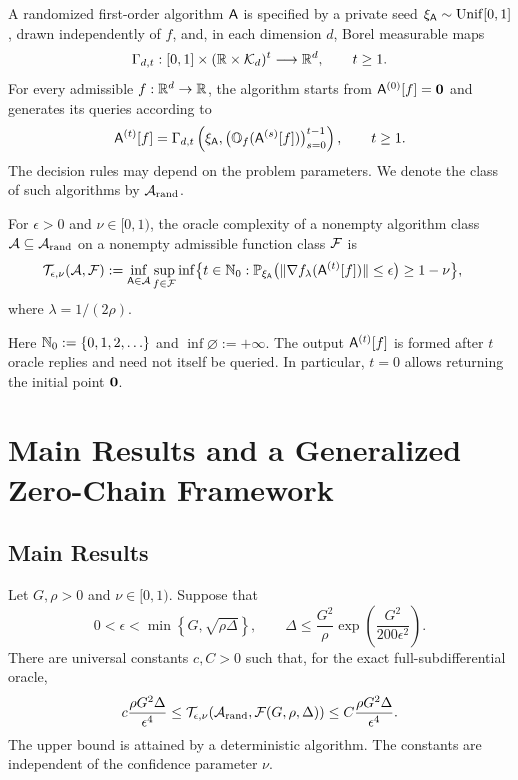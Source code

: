 \begin{definition}
\label{def:randomized-algorithm}
A randomized first-order algorithm ${\mathsf{A}}$ is specified by a private
seed $\xi_{{\mathsf{A}}}\sim\operatorname{Unif}[0,1]$, drawn independently
of $f$, and, in each dimension $d$, Borel measurable maps
\[
 \Gamma_{d,t}:
 [0,1]\times({\mathbb{R}}\times\mathcal K_d)^t\longrightarrow{\mathbb{R}}^d,
 \qquad t\geq1.
\]
For every admissible $f:{\mathbb{R}}^d\to{\mathbb{R}}$, the algorithm starts from
${\mathsf{A}}^{(0)}[f]={\mathbf 0}$ and generates its queries according to
\[
 {\mathsf{A}}^{(t)}[f]=\Gamma_{d,t}\left(
 \xi_{{\mathsf{A}}},
 \bigl(\mathbb O_f({\mathsf{A}}^{(s)}[f])\bigr)_{s=0}^{t-1}
 \right),\qquad t\geq1.
\]
The decision rules may depend on the problem parameters.
We denote the class of such algorithms by $\mathcal A_{\operatorname{rand}}$.
\end{definition}

\begin{definition}
\label{def:complexity-algorithm-class}
For $\epsilon>0$ and $\nu\in[0,1)$, the oracle complexity
of a nonempty algorithm class ${\cal A}\subseteq{\cal A}_{\operatorname{rand}}$
on a nonempty admissible function class ${\cal F}$ is
\[
\begin{aligned}
 {\cal T}_{\epsilon,\nu}({\cal A},{\cal F})
 :=\inf_{{\mathsf{A}}\in{\cal A}}\sup_{f\in{\cal F}}
 \inf\bigl\{t\in{\mathbb{N}}_0:\;&
 {\mathbb{P}}_{\xi_{{\mathsf{A}}}}\bigl(
 \|\nabla f_\lambda({\mathsf{A}}^{(t)}[f])\|\leq\epsilon
 \bigr)\geq1-\nu\bigr\},
\end{aligned}
\]
where $\lambda=1/(2\rho)$.
\end{definition}

Here ${\mathbb{N}}_0:=\{0,1,2,\ldots\}$ and $\inf\varnothing:=+\infty$.
The output ${\mathsf{A}}^{(t)}[f]$ is formed after $t$ oracle replies
and need not itself be queried. In particular, $t=0$
allows returning the initial point ${\mathbf 0}$.
\endgroup


\begingroup
\color{black}
\section{Main Results and a Generalized Zero-Chain Framework}
\label{sec:framework}

\subsection{Main Results}
\label{subsec:main-results}
\begin{theorem}
\label{thm:main}
\label{thm:rand}
Let $G,\rho>0$ and $\nu\in[0,1)$. Suppose that
\[
 0<\epsilon<\min\!\left\{G,\sqrt{\rho\Delta}\right\},
 \qquad
 \Delta\leq\frac{G^2}{\rho}
       \exp\!\left(\frac{G^2}{200\epsilon^2}\right).
\]
There are universal constants $c,C>0$ such that, for the exact
full-subdifferential oracle,
\[
 c\frac{\rho G^2\Delta}{\epsilon^4}
 \leq{\cal T}_{\epsilon,\nu}
       ({\cal A}_{\operatorname{rand}},{\cal F}(G,\rho,\Delta))
 \leq C\frac{\rho G^2\Delta}{\epsilon^4}.
\]
The upper bound is attained by a deterministic algorithm.
The constants are independent of the confidence parameter $\nu$.
\end{theorem}


